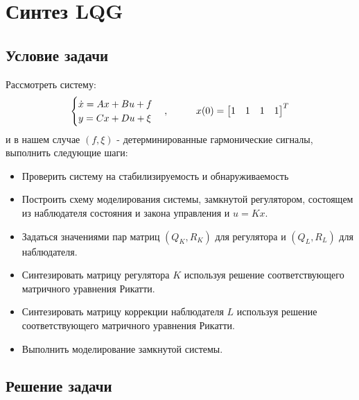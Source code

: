 \chapter{Синтез LQG}
\label{ch:chap3}
\section{Условие задачи}

Рассмотреть систему:
$$
    \begin{cases}
      \dot{x} = Ax + Bu + f \\
      y = Cx + Du + \xi
    \end{cases}, \hspace*{1cm} x(0) = \begin{bmatrix}
      1 & 1 & 1 & 1
    \end{bmatrix}^T
$$ и в нашем случае $(f, \xi)$ - детерминированные гармонические сигналы, выполнить следующие шаги:
  \begin{itemize}
  \item  Проверить систему на стабилизируемость и обнаруживаемость
  \item  Построить схему моделирования системы, замкнутой регулятором, состоящем
  из наблюдателя состояния и закона управления и $u = Kx$.
  \item Задаться значениями пар матриц $(Q_K,R_K)$ для регулятора и $(Q_L,R_L)$ для наблюдателя.
  \item Синтезировать матрицу регулятора $K$ используя решение соответствующего матричного уравнения Рикатти.
  \item  Синтезировать матрицу коррекции наблюдателя $L$ используя решение соответствующего матричного уравнения Рикатти.
  \item Выполнить моделирование замкнутой системы.
 
  \end{itemize}
      
\section{Решение задачи}

